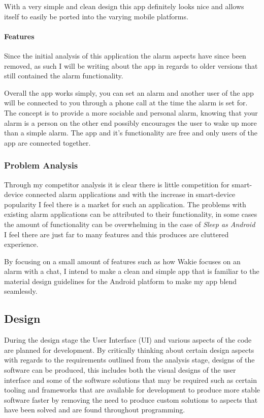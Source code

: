 With a very simple and clean design this app definitely looks nice and
allows itself to easily be ported into the varying mobile platforms.

\paragraph{Features}\label{features-2}

Since the initial analysis of this application the alarm aspects have
since been removed, as such I will be writing about the app in regards
to older versions that still contained the alarm functionality.

Overall the app works simply, you can set an alarm and another user of
the app will be connected to you through a phone call at the time the
alarm is set for. The concept is to provide a more sociable and personal
alarm, knowing that your alarm is a person on the other end possibly
encourages the user to wake up more than a simple alarm. The app and
it's functionality are free and only users of the app are connected
together.

\subsubsection{Problem Analysis}\label{problem-analysis}

Through my competitor analysis it is clear there is little competition
for smart-device connected alarm applications and with the increase in
smart-device popularity I feel there is a market for such an
application. The problems with existing alarm applications can be
attributed to their functionality, in some cases the amount of
functionality can be overwhelming in the case of \emph{Sleep as Android}
I feel there are just far to many features and this produces are
cluttered experience.

By focusing on a small amount of features such as how Wakie focuses on
an alarm with a chat, I intend to make a clean and simple app that is
familiar to the material design guidelines for the Android platform to
make my app blend seamlessly.

\subsection{Design}\label{design}

During the design stage the User Interface (UI) and various aspects of
the code are planned for development. By critically thinking about
certain design aspects with regards to the requirements outlined from
the analysis stage, designs of the software can be produced, this
includes both the visual designs of the user interface and some of the
software solutions that may be required such as certain tooling and
frameworks that are available for development to produce more stable
software faster by removing the need to produce custom solutions to
aspects that have been solved and are found throughout programming.

